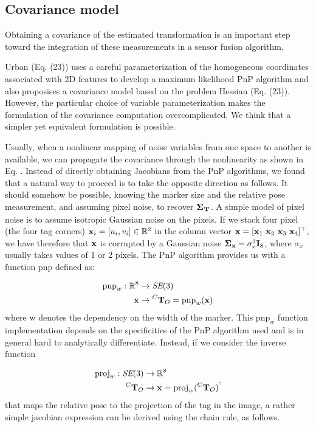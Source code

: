 \subsection{Covariance model}
Obtaining a covariance of the estimated transformation is an important step toward the integration of these measurements in a sensor fusion algorithm.

Urban \cite{urban2016mlpnp} (Eq. (23)) uses a careful parameterization of the homogeneous coordinates associated with 2D features to develop
a maximum likelihood PnP algorithm and also proposises a covariance model based on the problem Hessian (Eq. (23)).  However, the particular choice of variable parameterization makes the formulation of the covariance computation overcomplicated.
We think that a simpler yet equivalent formulation is possible. 

Usually, when a nonlinear mapping of noise variables from one space to another is available, we can propagate the covariance through the nonlinearity
as shown in Eq. .  
Instead of directly obtaining Jacobians from the PnP algorithms, we found that a natural way to proceed is to take the opposite 
direction as follows. It should somehow be possible, knowing the marker size and the relative pose measurement, and assuming pixel noise, to
recover ${\bm \Sigma}_{\prescript{}{}{{\bf T}}_{}}$. A simple model of pixel noise is to assume isotropic Gaussian noise on the pixels. If we stack four pixel (the four tag corners) 
${\bf x}_i = [u_i, v_i] \in \mathbb{R}^2$ in the column vector ${\bf x} = [{\bf x}_1~{\bf x}_2~{\bf x}_3~{\bf x}_4]^{\top}$, we have therefore that
${\bf x}$ is corrupted by a Gaussian noise ${\bm \Sigma}_{{\bf x}} = \sigma_{x}^2 {\bf I}_8$, where $\sigma_{x}$ usually takes values of 1 or 2 pixels.
The PnP algorithm provides us with a function $\text{pnp}$ defined as:

\begin{equation}
    \begin{split}
        \text{pnp}_w: \mathbb{R}^8 &\rightarrow \textit{SE}(3) \\
                           {\bf x} &\rightarrow \prescript{C}{}{{\bf T}}_{O} = \text{pnp}_w({\bf x})
    \end{split}
\end{equation}
%
where w denotes the dependency on the width of the marker. This $\text{pnp}_w$ function implementation depends on the specificities of the PnP algorithm used and  
is in general hard to analytically differentiate. Instead, if we consider the inverse function

\begin{equation}
    \begin{split}
        \text{proj}_w: \textit{SE}(3) &\rightarrow \mathbb{R}^8 \\
                           \prescript{C}{}{{\bf T}}_{O} &\rightarrow {\bf x} = \text{proj}_w(\prescript{C}{}{{\bf T}}_{O})
    \end{split},
\end{equation}
%
that maps the relative pose to the projection of the tag in the image, a rather simple jacobian expression can be derived using the chain rule, as follows.

